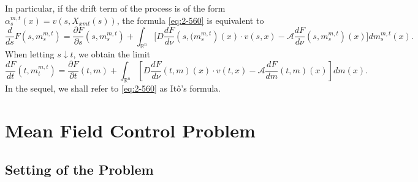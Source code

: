 \documentclass[11pt]{article}
\numberwithin{equation}{section}
\newcommand{\brn}{{\mathbb{R}^n}}
\newcommand{\1}{\mbox{1\hspace{-1mm}I}}
\begin{document}
In particular, if the drift term of the process is of the form $\alpha^{m,t}_s(x)=v(s,X_{xmt}(s))$, the formula \eqref{eq:2-560} is equivalent to 
\begin{equation}
    \dfrac{d}{ds}F\left(s,m^{m,t}_s\right)=\dfrac{\partial F}{\partial s}\left(s,m^{m,t}_s\right)+\int_{\brn}\bigg[D\dfrac{dF}{d\nu}\left(s,(m^{m,t}_s\right)(x)\cdot v(s,x)-\mathcal{A}\dfrac{dF}{d\nu}\left(s,m^{m,t}_s\right)(x)\bigg]dm^{m,t}_s(x). \label{eq:2-561}
\end{equation}
When letting $s\downarrow t$, we obtain the limit 
\begin{equation*}
    \dfrac{dF}{dt}\left(t,m^{m,t}_t\right)=\dfrac{\partial F}{\partial t}(t,m)+\int_{\brn}\left[D\dfrac{dF}{d\nu}(t,m)(x)\cdot v(t,x)-\mathcal{A}\dfrac{dF}{dm}(t,m)(x)\right]dm(x). 
\end{equation*}
In the sequel, we shall refer to \eqref{eq:2-560}  as It\^o's formula. 

\section{Mean Field Control Problem}\label{sec:MFTC}

\subsection{Setting of the Problem}
\end{document}
